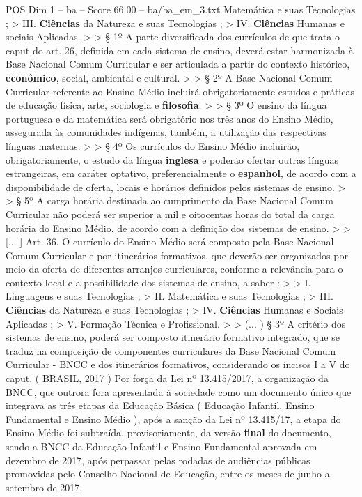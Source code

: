 \begin{textsample}{POS Dim 1 – ba – Score 66.00 – ba/ba\_em\_3.txt}
Matemática e suas Tecnologias ; > III. \textbf{Ciências} da Natureza e suas Tecnologias ; > IV. \textbf{Ciências} Humanas e sociais Aplicadas. > > § 1º A parte diversificada dos currículos de que trata o caput do art. 26, definida em cada sistema de ensino, deverá estar harmonizada à Base Nacional Comum Curricular e ser articulada a partir do contexto histórico, \textbf{econômico}, social, ambiental e cultural. > > § 2º A Base Nacional Comum Curricular referente ao Ensino Médio incluirá obrigatoriamente estudos e práticas de educação física, arte, sociologia e \textbf{filosofia}. > > § 3º O ensino da língua portuguesa e da matemática será obrigatório nos três anos do Ensino Médio, assegurada às comunidades indígenas, também, a utilização das respectivas línguas maternas. > > § 4º Os currículos do Ensino Médio incluirão, obrigatoriamente, o estudo da língua \textbf{inglesa} e poderão ofertar outras línguas estrangeiras, em caráter optativo, preferencialmente o \textbf{espanhol}, de acordo com a disponibilidade de oferta, locais e horários definidos pelos sistemas de ensino. > > § 5º A carga horária destinada ao cumprimento da Base Nacional Comum Curricular não poderá ser superior a mil e oitocentas horas do total da carga horária do Ensino Médio, de acordo com a definição dos sistemas de ensino. > > [... ] Art. 36.
O currículo do Ensino Médio será composto pela Base Nacional Comum Curricular e por itinerários formativos, que deverão ser organizados por meio da oferta de diferentes arranjos curriculares, conforme a relevância para o contexto local e a possibilidade dos sistemas de ensino, a saber : > > I.
Linguagens e suas Tecnologias ; > II.
Matemática e suas Tecnologias ; > III. \textbf{Ciências} da Natureza e suas Tecnologias ; > IV. \textbf{Ciências} Humanas e Sociais Aplicadas ; > V.
Formação Técnica e Profissional. > > (... ) § 3º A critério dos sistemas de ensino, poderá ser composto itinerário formativo integrado, que se traduz na composição de componentes curriculares da Base Nacional Comum Curricular - BNCC e dos itinerários formativos, considerando os incisos I a V do caput. ( BRASIL, 2017 ) Por força da Lei nº 13.415/2017, a organização da BNCC, que outrora fora apresentada à sociedade como um documento único que integrava as três etapas da Educação Básica ( Educação Infantil, Ensino Fundamental e Ensino Médio ), após a sanção da Lei nº 13.415/17, a etapa do Ensino Médio foi subtraída, provisoriamente, da versão \textbf{final} do documento, sendo a BNCC da Educação Infantil e Ensino Fundamental aprovada em dezembro de 2017, após perpassar pelas rodadas de audiências públicas promovidas pelo Conselho Nacional de Educação, entre os meses de junho a setembro de 2017.

\end{textsample}
